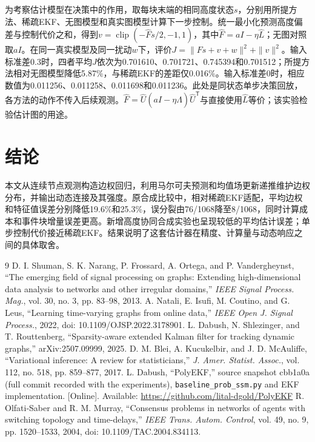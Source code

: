 \documentclass[journal]{IEEEtran}
\newcommand{\T}{\mathsf T}
\begin{document}
为考察估计模型在决策中的作用，取每块末端的相同高度状态$s$，分别用所提方法、稀疏EKF、无图模型和真实图模型计算下一步控制。统一最小化预测高度偏差与控制代价之和，得到$v=\operatorname{clip}(-\hat F s/2,-1,1)$，其中$\hat F=aI-\eta\hat L$；无图对照取$aI$。在同一真实模型及同一扰动$w$下，评价$J=\|Fs+v+w\|^2+\|v\|^2$。输入标准差0.3时，四者平均$J$依次为0.701610、0.701721、0.745394和0.701512；所提方法相对无图模型降低5.87\%，与稀疏EKF的差距仅0.016\%。输入标准差0时，相应数值为0.011256、0.011258、0.011698和0.011236。此处是同状态单步决策回放，各方法的动作不传入后续观测。$\hat F=\hat U(aI-\eta\hat\Lambda)\hat U^\T$与直接使用$\hat L$等价；该实验检验估计图的用途。

\section{结论}
本文从连续节点观测构造边权回归，利用马尔可夫预测和均值场更新递推维护边权分布，并输出动态连接及其强度。原合成比较中，相对稀疏EKF适配，平均边权和特征值误差分别降低19.6\%和25.3\%，误分裂由76/1068降至8/1068，同时计算成本和事件块增量误差更高。新增高度协同合成实验也呈现较低的平均估计误差；单步控制代价接近稀疏EKF。结果说明了这套估计器在精度、计算量与动态响应之间的具体取舍。

\begin{thebibliography}{9}
 D. I. Shuman, S. K. Narang, P. Frossard, A. Ortega, and P. Vandergheynst, ``The emerging field of signal processing on graphs: Extending high-dimensional data analysis to networks and other irregular domains,'' \emph{IEEE Signal Process. Mag.}, vol. 30, no. 3, pp. 83--98, 2013.
 A. Natali, E. Isufi, M. Coutino, and G. Leus, ``Learning time-varying graphs from online data,'' \emph{IEEE Open J. Signal Process.}, 2022, doi: 10.1109/OJSP.2022.3178901.
 L. Dabush, N. Shlezinger, and T. Routtenberg, ``Sparsity-aware extended Kalman filter for tracking dynamic graphs,'' arXiv:2507.09999, 2025.
 D. M. Blei, A. Kucukelbir, and J. D. McAuliffe, ``Variational inference: A review for statisticians,'' \emph{J. Amer. Statist. Assoc.}, vol. 112, no. 518, pp. 859--877, 2017.
 L. Dabush, ``PolyEKF,'' source snapshot cbb1a0a (full commit recorded with the experiments), \texttt{baseline\_prob\_ssm.py} and EKF implementation. [Online]. Available: \url{https://github.com/lital-dgold/PolyEKF}
 R. Olfati-Saber and R. M. Murray, ``Consensus problems in networks of agents with switching topology and time-delays,'' \emph{IEEE Trans. Autom. Control}, vol. 49, no. 9, pp. 1520--1533, 2004, doi: 10.1109/TAC.2004.834113.
\end{thebibliography}
\end{document}
